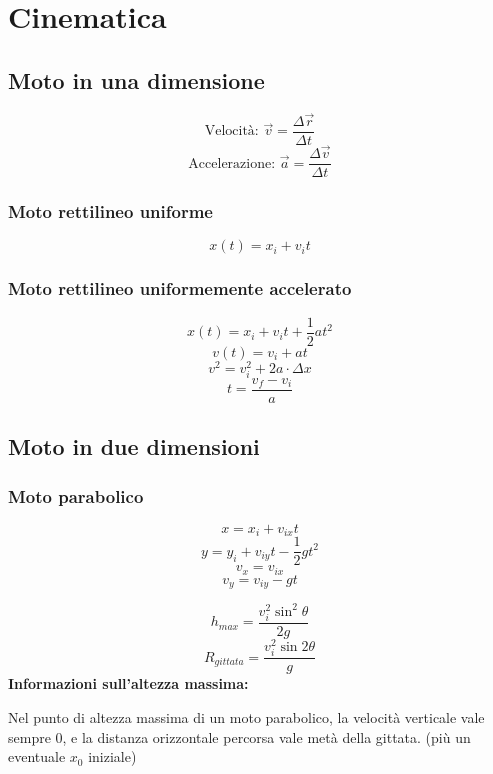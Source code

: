 \documentclass[a4paper]{article}
\theoremstyle{break}
\theoremstyle{break}
\theoremstyle{break}
\theoremstyle{break}
\begin{document}
\section{Cinematica}
\subsection{Moto in una dimensione}
\[
  \text{Velocità: } \vec{v} = \frac{\Delta \vec{r}}{\Delta t}
\] 
\[
  \text{Accelerazione: } \vec{a} = \frac{\Delta \vec{v}}{\Delta t}
\] 
\subsubsection{Moto rettilineo uniforme}
\[
x(t) = x_i + v_i t
\] 

\subsubsection{Moto rettilineo uniformemente accelerato}
\[
  x(t) = x_i + v_i t + \frac{1}{2} a t^2
\]
\[
  v(t) = v_i + a t
\]
\[
  v^2 = v_i^2 + 2 a \cdot \Delta x
\]
\[
  t = \frac{v_f - v_i}{a}
\] 

\subsection{Moto in due dimensioni}
\subsubsection{Moto parabolico}
\[
  x = x_i + v_{ix} t
\] 
\[
  y = y_i + v_{iy} t - \frac{1}{2} g t^2
\]
\vspace{1em}
\[
  v_x = v_{ix}
\]
\[
  v_y = v_{iy} - g t
\]

\vspace{1em}
\[
  h_{max} = \frac{v_i^2 \sin^2 \theta}{2g}
\] 
\[
  R_{gittata} = \frac{v_i^2 \sin 2\theta}{g}
\] 
\textbf{Informazioni sull'altezza massima:}

\noindent Nel punto di altezza massima di un moto parabolico, la velocità verticale vale
sempre \( 0 \), e la distanza orizzontale percorsa vale metà della gittata. (più un eventuale
\( x_0 \)  iniziale)
\end{document}
